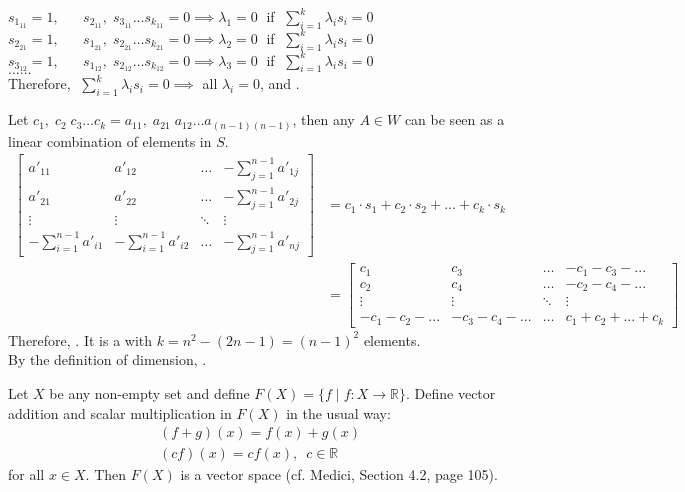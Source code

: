 \documentclass[10pt]{article}
\newcommand{\noin}{\noindent}
\begin{document}
{{\begin{spacing}{1.5}
\begin{center}
    $s_{1_{11}}=1,\;\;\;\;\;\;s_{2_{11}},\;s_{3_{11}}\dots s_{k_{11}}=0\implies \lambda_1=0\;$  if  $\;\sum_{i=1}^k\lambda_i s_i=0$\\
    $s_{2_{21}}=1,\;\;\;\;\;\;s_{1_{21}},\;s_{2_{21}}\dots s_{k_{21}}=0\implies \lambda_2=0\;$  if  $\;\sum_{i=1}^k\lambda_i s_i=0$\\
    $s_{3_{12}}=1,\;\;\;\;\;\;s_{1_{12}},\;s_{2_{12}}\dots s_{k_{12}}=0\implies \lambda_3=0\;$  if  $\;\sum_{i=1}^k\lambda_i s_i=0$\\
    $\dots\dots$\\
    Therefore, $\;\sum_{i=1}^k\lambda_i s_i=0\implies$ all $\lambda_i=0$, and .
    \begin{spacing}{2}
    \end{spacing}
    Let $c_1,\;c_2\;c_3\dots c_k=a_{11},\;a_{21}\;a_{12}\dots a_{(n-1)(n-1)}$, then any $A\in W$ can be seen as a linear combination of elements in $S$.
    \vspace{-10pt}
    \begin{align*}
    \begin{bmatrix}
    a'_{11} & a'_{12} & \dots & -\sum^{n-1}_{j=1}a'_{1j}\\
    a'_{21} & a'_{22} & \dots & -\sum^{n-1}_{j=1}a'_{2j}\\
    \vdots & \vdots & \ddots & \vdots\\
    -\sum^{n-1}_{i=1}a'_{i1} & -\sum^{n-1}_{i=1}a'_{i2} & \dots & -\sum^{n-1}_{j=1}a'_{nj}
    \end{bmatrix}
    &=
    c_1\cdot s_1+c_2\cdot s_2+\dots+c_k\cdot s_k\\&=
    \begin{bmatrix}
        c_1&c_3&\dots&-c_1-c_3-...\\
        c_2&c_4&\dots&-c_2-c_4-...\\
        \vdots&\vdots&\ddots&\vdots\\
        -c_1-c_2-...&-c_3-c_4-...&\dots&c_1+c_2+...+c_k
    \end{bmatrix}
    \end{align*}
    Therefore, . It is a  with $k=n^2-(2n-1)=(n-1)^2$ elements. \\
    By the definition of dimension, .
    
    \end{center}
    \end{spacing}
} 
\pagebreak
\newpage
\noin{\bf 2.} Let $X$ be any non-empty set and define $F(X)=\{ f \mid f: X\to \mathbb R\}$.  Define vector addition and scalar multiplication in $F(X)$ in the usual way:
\begin{align*}
(f+g)(x)=f(x)+g(x)\\
(cf)(x)=cf(x),\,\,\, c\in \mathbb R
\end{align*}
for all $x\in X$.  Then $F(X)$ is a vector space (cf. Medici, Section 4.2, page 105).
\vspace{10pt}

}
\end{document}
